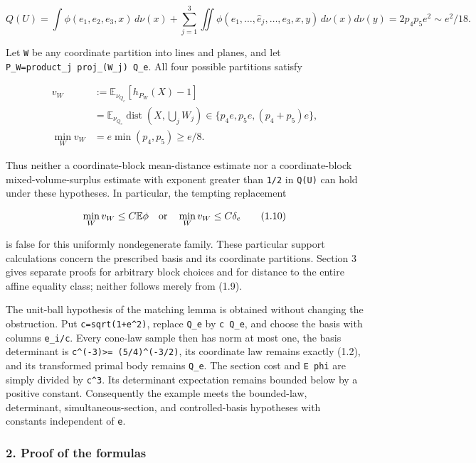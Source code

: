 \documentclass[
  11pt,
]{article}
\begin{document}
\[
 Q(U)=\int\phi(e_1,e_2,e_3,x)\,d\nu(x)
   +\sum_{j=1}^3\iint\phi(e_1,\ldots,\widehat e_j,\ldots,e_3,x,y)
                      \,d\nu(x)d\nu(y)
       =2p_4p_5e^2\sim e^2/18.
 \tag{1.8}
\]

Let \texttt{W} be any coordinate partition into lines and planes, and
let \texttt{P\_W=product\_j\ proj\_(W\_j)\ Q\_e}. All four possible
partitions satisfy

\[
\begin{aligned}
 v_W&:=\mathbb E_{\nu_{Q_e}}[h_{P_W}(X)-1]\\
 &=\mathbb E_{\nu_{Q_e}}\operatorname{dist}(X,\bigcup_j W_j)
 \in\{p_4e,p_5e,(p_4+p_5)e\},\\
 \min_W v_W&=e\min(p_4,p_5)\ge e/8.
\end{aligned}\tag{1.9}
\]

Thus neither a coordinate-block mean-distance estimate nor a
coordinate-block mixed-volume-surplus estimate with exponent greater
than \texttt{1/2} in \texttt{Q(U)} can hold under these hypotheses. In
particular, the tempting replacement

\[
 \min_W v_W\le C\mathbb E\phi
 \quad\hbox{or}\quad
 \min_W v_W\le C\delta_e
 \tag{1.10}
\]

is false for this uniformly nondegenerate family. These particular
support calculations concern the prescribed basis and its coordinate
partitions. Section 3 gives separate proofs for arbitrary block choices
and for distance to the entire affine equality class; neither follows
merely from (1.9).

The unit-ball hypothesis of the matching lemma is obtained without
changing the obstruction. Put \texttt{c=sqrt(1+e\^{}2)}, replace
\texttt{Q\_e} by \texttt{c\ Q\_e}, and choose the basis with columns
\texttt{e\_i/c}. Every cone-law sample then has norm at most one, the
basis determinant is \texttt{c\^{}(-3)\textgreater{}=\ (5/4)\^{}(-3/2)},
its coordinate law remains exactly (1.2), and its transformed primal
body remains \texttt{Q\_e}. The section cost and \texttt{E\ phi} are
simply divided by \texttt{c\^{}3}. Its determinant expectation remains
bounded below by a positive constant. Consequently the example meets the
bounded-law, determinant, simultaneous-section, and controlled-basis
hypotheses with constants independent of \texttt{e}.

\subsubsection{2. Proof of the formulas}\label{proof-of-the-formulas}
\end{document}
